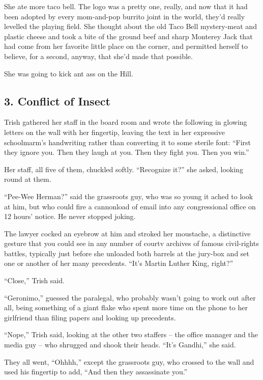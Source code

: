 She ate more taco bell. The logo was a pretty one, really, and now that 
it had been adopted by every mom-and-pop burrito joint in the world, 
they'd really levelled the playing field. She thought about the old 
Taco Bell mystery-meat and plastic cheese and took a bite of the ground 
beef and sharp Monterey Jack that had come from her favorite little 
place on the corner, and permitted herself to believe, for a second, 
anyway, that she'd made that possible.

She was going to kick ant ass on the Hill.


\subsection{3. Conflict of Insect}

Trish gathered her staff in the board room and wrote the following in 
glowing letters on the wall with her fingertip, leaving the text in her 
expressive schoolmarm's handwriting rather than converting it to some 
sterile font: “First they ignore you. Then they laugh at you. Then 
they fight you. Then you win.”

Her staff, all five of them, chuckled softly. “Recognize it?” she 
asked, looking round at them.

“Pee-Wee Herman?” said the grassroots guy, who was so young it 
ached to look at him, but who could fire a cannonload of email into any 
congressional office on 12 hours' notice. He never stopped joking.

The lawyer cocked an eyebrow at him and stroked her moustache, a 
distinctive gesture that you could see in any number of courtv archives 
of famous civil-rights battles, typically just before she unloaded both 
barrels at the jury-box and set one or another of her many precedents. 
“It's Martin Luther King, right?”

“Close,” Trish said.

“Geronimo,” guessed the paralegal, who probably wasn't going to 
work out after all, being something of a giant flake who spent more 
time on the phone to her girlfriend than filing papers and looking up 
precedents.

“Nope,” Trish said, looking at the other two staffers -- the office 
manager and the media guy -- who shrugged and shook their heads. 
“It's Gandhi,” she said.

They all went, “Ohhhh,” except the grassroots guy, who crossed to 
the wall and used his fingertip to add, “And then they assassinate 
you.”

